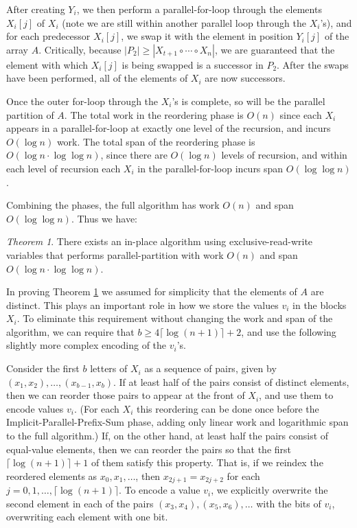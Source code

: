 \documentclass[sigconf]{acmart}
\renewcommand{\paragraph}[1]{\vspace{0.09in}\noindent{\bf \boldmath #1.}}
\theoremstyle{remark}
\newtheorem{theorem}{Theorem}[section]
\theoremstyle{remark}
\begin{document}
After creating $Y_i$, we then perform a parallel-for-loop through the
elements $X_i[j]$ of $X_i$ (note we are still within another parallel
loop through the $X_i$'s), and for each predecessor $X_i[j]$, we swap
it with the element in position $Y_i[j]$ of the array $A$. Critically,
because $|P_2| \ge |X_{t + 1} \circ \cdots \circ X_n|$, we are
guaranteed that the element with which $X_i[j]$ is being swapped is a
successor in $P_2$. After the swaps have been performed, all of the
elements of $X_i$ are now successors.

Once the outer for-loop through the $X_i$'s is complete, so will be
the parallel partition of $A$. The total work in the reordering phase
is $O(n)$ since each $X_i$ appears in a parallel-for-loop at exactly
one level of the recursion, and incurs $O(\log n)$ work. The total
span of the reordering phase is $O(\log n \cdot \log \log n)$, since
there are $O(\log n)$ levels of recursion, and within each level of
recursion each $X_i$ in the parallel-for-loop incurs span $O(\log \log
n)$.

Combining the phases, the full algorithm has work $O(n)$ and span
$O(\log \log n)$. Thus we have:
\begin{theorem}
  There exists an in-place algorithm using exclusive-read-write
  variables that performs parallel-partition with work $O(n)$ and span
  $O(\log n \cdot \log \log n)$.
  \label{thminplace}
\end{theorem}

\paragraph{Allowing for Repeated Elements} In proving Theorem \ref{thminplace} we assumed for simplicity that the elements of $A$ are distinct. This plays an important role in how we store the values $v_i$ in the blocks $X_i$. To eliminate this requirement without changing the work and span of the algorithm, we can require that $b \ge 4 \lceil \log (n + 1) \rceil + 2$, and use the following slightly more complex encoding of the $v_i$'s.

Consider the first $b$ letters of $X_i$ as a sequence of pairs, given
by $(x_1, x_2), \ldots, (x_{b - 1}, x_b)$. If at least half of the
pairs consist of distinct elements, then we can reorder those pairs to
appear at the front of $X_i$, and use them to encode values
$v_i$. (For each $X_i$ this reordering can be done once before the
Implicit-Parallel-Prefix-Sum phase, adding only linear work and
logarithmic span to the full algorithm.) If, on the other hand, at
least half the pairs consist of equal-value elements, then we can
reorder the pairs so that the first $\lceil \log (n + 1) \rceil + 1$
of them satisfy this property. That is, if we reindex the reordered
elements as $x_0,x_1,\ldots$, then $x_{2j + 1} = x_{2j + 2}$ for each
$j = 0, 1, \ldots, \lceil \log (n + 1) \rceil$. To encode a value
$v_i$, we explicitly overwrite the second element in each of the pairs
$(x_3, x_4), (x_5, x_6), \ldots$ with the bits of $v_i$, overwriting
each element with one bit.
\end{document}

